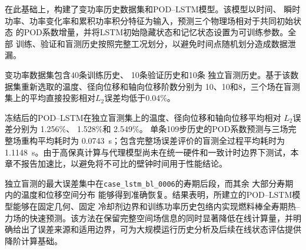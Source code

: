 在此基础上，构建了变功率历史数据集和POD--LSTM模型。该模型以时间、
瞬时功率、功率变化率和累积功率积分特征为输入，预测三个物理场相对于共同初始状态
的POD系数增量，并将LSTM初始隐藏状态和记忆状态设置为可训练参数。全部
训练、验证和盲测历史按照完整工况划分，以避免时间点随机划分造成数据泄漏。

变功率数据集包含40条训练历史、
10条验证历史和10条
独立盲测历史。基于该数据集重新选取的温度、径向位移和轴向位移阶数分别为
10、10和8，三个场在盲测集上的平均直接投影相对$L_2$误差均低于0.04\%。

冻结后的POD--LSTM在独立盲测集上的温度、径向位移和轴向位移平均相对
$L_2$误差分别为
1.256\%、
1.528\%和
2.549\%。
单条109步历史的POD系数预测与三场完整场重构平均耗时为
0.0743~s；包含完整场误差评价的盲测全过程平均耗时为1.1148~s。由于高保真计算与代理模型尚未在统一硬件和一致计时边界下测试，本章不报告加速比，以避免将不可比的壁钟时间用于性能结论。

独立盲测的最大误差集中在\texttt{case\_lstm\_bl\_0006}的寿期后段，而其余
大部分寿期内的温度和位移空间分布
能够得到准确恢复。结果表明，所建立的POD--LSTM模型能够在固定几何、固定
冷却剂边界和训练功率历史包络内实现燃料棒全寿期热--力场的快速预测。该方法在保留完整空间场信息的同时显著降低在线计算量，并明确给出了误差来源和适用边界，可为大规模运行历史分析及后续在线状态评估提供降阶计算基础。

